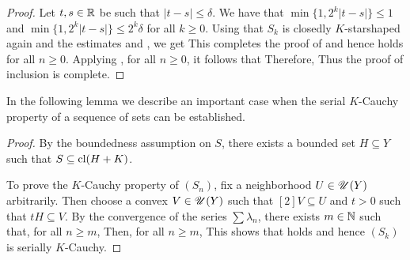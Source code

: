\begin{proof}
Let $t,s\in\mathbb{R}$ be such that $|t-s|\leq\delta$. We have that $\min\big\{1,2^k|t-s|\big\}\leq 1$ and
$\min\big\{1,2^k|t-s|\big\}\leq 2^{k}\delta$ for all $k\geq0$.  
Using that $S_k$ is closedly $K$-starshaped again and the estimates  and , we get
This completes the proof of  and hence  holds for all $n\geq0$. Applying , for all $n\geq0$, it 
follows that
Therefore,
Thus the proof of inclusion  is complete.
\end{proof}

In the following lemma we describe an important case when the serial $K$-Cauchy property of a sequence of sets can 
be established.


\begin{proof} By the boundedness assumption on $S$, there exists a bounded set $H\subseteq Y$ such that 
$S\subseteq\mathop{\hbox{\rm cl}}\nolimits(H+K)$.

To prove the $K$-Cauchy property of $(S_n)$, fix a neighborhood $U\in\mathscr{U}(Y)$ arbitrarily. Then choose a convex 
$V\in\mathscr{U}(Y)$ such that $[2]V\subseteq U$ and $t>0$ such that $tH\subseteq V$. By the convergence of the series $\sum 
\lambda_n$, there
exists $m\in\mathbb{N}$ such that, for all $n\geq m$,
Then, for all $n\geq m$,
This shows that  holds and hence $(S_k)$ is serially $K$-Cauchy.
\end{proof}